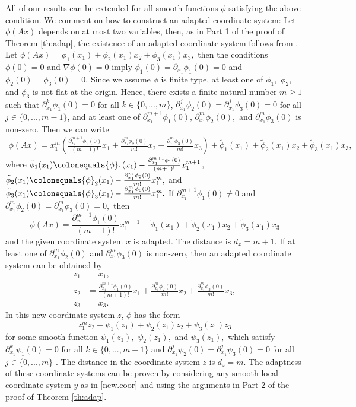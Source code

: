\documentclass[a4paper, 11pt]{article}
\theoremstyle{plain}
\theoremstyle{definition}
\theoremstyle{lemma}
\theoremstyle{Remark}
\theoremstyle{proposition}
\theoremstyle{corollary}
\theoremstyle{example}
\theoremstyle{assumption}
\begin{document}
All of our results can be extended for all smooth  functions  $\phi$ satisfying the above condition.
  We comment on how to construct an adapted coordinate system: Let $\phi(Ax)$ depends on at most two variables, then, as in Part 1 of the proof of Theorem \ref{th:adap},  the existence of an adapted coordinate system follows from \cite{Adap}.
Let $\phi(Ax)=\phi_1(x_1)+\phi_2(x_1)x_2+\phi_3(x_1)x_3,$ then the conditions $\phi(0)=0$ and $\nabla \phi(0)=0$ imply $\phi_1(0)=\partial_{x_1}\phi_1(0)=0$ and $\phi_2(0)=\phi_3(0)=0.$
 Since we assume $\phi$ is finite type, at least one of $\phi_1,$ $\phi_2$, and $\phi_3$ is not flat at the origin. Hence, there exists a finite natural number $m\geq 1$ such that $ \partial_{x_1}^{k}\phi_1(0)=0$ for all $k\in \{0,...,m\}$, $\partial_{x_1}^{j}\phi_2(0)= \partial_{x_1}^{j}\phi_3(0)=0$ for all $j\in \{0,...,m-1\}$,   and at least one of $\partial^{m+1}_{x_1}\phi_1(0),\,\partial^{m}_{x_1}\phi_2(0),$ and $\partial^{m}_{x_1}\phi_3(0)$ is non-zero.
Then we can write \begin{align*}
\phi(Ax)= x_1^{m}\left(\frac{\partial^{m+1}_{x_1}\phi_1(0)}{(m+1)!}x_1+\frac{\partial^{m}_{x_1}\phi_2(0)}{m !}x_2+\frac{\partial^{m}_{x_1}\phi_3(0)}{m!}x_3\right)
+\tilde{\phi}_1(x_1)+\tilde{\phi}_2(x_1)x_2+\tilde{\phi}_3(x_1)x_3,
\end{align*}
where $\tilde{\phi}_1(x_1)\colonequals {\phi}_1(x_1)-\frac{\partial^{m+1}_{x_1}\phi_1(0)}{(m+1)!}x_1^{m+1}$, $\tilde{\phi}_2(x_1)\colonequals {\phi}_2(x_1)-\frac{\partial^{m}_{x_1}\phi_2(0)}{m !}x_1^{m},$ and $\tilde{\phi}_3(x_1)\colonequals {\phi}_3(x_1)-\frac{\partial^{m}_{x_1}\phi_3(0)}{m!}x_1^{m}.$
If $\partial^{m+1}_{x_1} \phi_1(0) \neq 0$ and $\partial^{m}_{x_1}\phi_2(0)=\partial^{m}_{x_1} \phi_3(0)=0,$ then
$$\phi(Ax)= \frac{\partial^{m+1}_{x_1}\phi_1(0)}{(m+1)!}x_1^{m+1}
+\tilde{\phi}_1(x_1)+\tilde{\phi}_2(x_1)x_2+\tilde{\phi}_3(x_1)x_3$$
 and  the given coordinate system $x$ is adapted. The distance is  $d_x=m+1$.   If at least one of $\partial^{m}_{x_1}\phi_2(0)$ and $\partial^{m}_{x_1}\phi_3(0)$ is non-zero, then an adapted coordinate system can be obtained by
\begin{align*}
z_1 &=x_1,\\
z_2 &= \frac{\partial^{m+1}_{x_1}\phi_1(0)}{(m+1)!}x_1+\frac{\partial^{m}_{x_1}\phi_2(0)}{m !}x_2+\frac{\partial^{m}_{x_1}\phi_3(0)}{m!}x_3,\\
z_3&=x_3.
\end{align*}
In this new coordinate system $z$, $\phi$ has the form
$$z_1^{m}z_2+\psi_1(z_1)+\psi_2(z_1)z_2+\psi_3(z_1)z_3$$
for some smooth function $\psi_1(z_1),$ $\psi_2(z_1),$ and $\psi_3(z_1),$ which satisfy    $ \partial_{x_1}^{k}\psi_1(0)=0$ for all $k\in \{0,...,m+1\}$ and $\partial_{x_1}^{j}\psi_2(0)= \partial_{x_1}^{j}\psi_3(0)=0$ for all $j\in \{0,...,m\}$ .
 The distance in the coordinate system $z$ is $d_z=m.$ The adaptness of these coordinate systems can be proven by considering any smooth local coordinate system $y$ as in \eqref{new.coor} and using the arguments in Part 2 of the proof of Theorem \ref{th:adap}.   %
\end{document}
